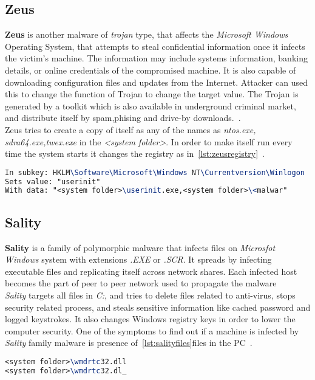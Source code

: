 \subsection{Zeus}
\label{sub:Zeus}
\textbf{Zeus} is another malware of \emph{trojan} type, that affects the \emph{Microsoft Windows} Operating System, that attempts to steal confidential information once it infects the victim's machine.
The information may include systems information, banking details, or online credentials of the compromised machine.
It is also capable of downloading configuration files and updates from the Internet. Attacker can used this to change the function of Trojan to change the target value. The Trojan is generated by a toolkit which is also available in underground criminal market, and distribute itself by spam,phising and drive-by downloads.~\cite[Trojan.Zbot]{zeus}.\\
Zeus tries to create a copy of itself as any of the names as \emph{ntos.exe, sdra64.exe,twex.exe} in the \textit{<system folder>}.
In order to make itself run every time the system starts it changes the registry as in~\autoref{lst:zeusregistry}~\cite[Win32/Zbot]{zeusmicro}.
\begin{lstlisting}[language=TeX,caption={Registry key modified by Zeus Trojan to autostart},label={lst:zeusregistry}]
In subkey: HKLM\Software\Microsoft\Windows NT\Currentversion\Winlogon
Sets value: "userinit"
With data: "<system folder>\userinit.exe,<system folder>\<malwar"
\end{lstlisting}
\subsection{Sality}
\label{sub:Sality}
\textbf{Sality} is a family of polymorphic malware that infects files on \emph{Microsfot Windows} system with extensions \emph{.EXE} or \emph{.SCR}.
It spreads by infecting executable files and replicating itself across network shares.
Each infected host becomes the part of peer to peer network used to propagate the malware~\cite[Sality]{salitysym} \\
\emph{Sality} targets all files in \emph{C:}, and tries to delete files related to anti-virus, stops security related process, and steals sensitive information like cached password and logged keystrokes.
It also changes Windows registry keys in order to lower the computer security.
One of the symptoms to find out if a machine is infected by \emph{Sality} family malware is presence of~\autoref{lst:salityfiles}files in the PC~\cite[Win32/Sality]{salitymicro}.
\begin{lstlisting}[language=TeX,caption={Files created by Sality in the infected machine},label={lst:salityfiles}]
<system folder>\wmdrtc32.dll
<system folder>\wmdrtc32.dl_
\end{lstlisting}
